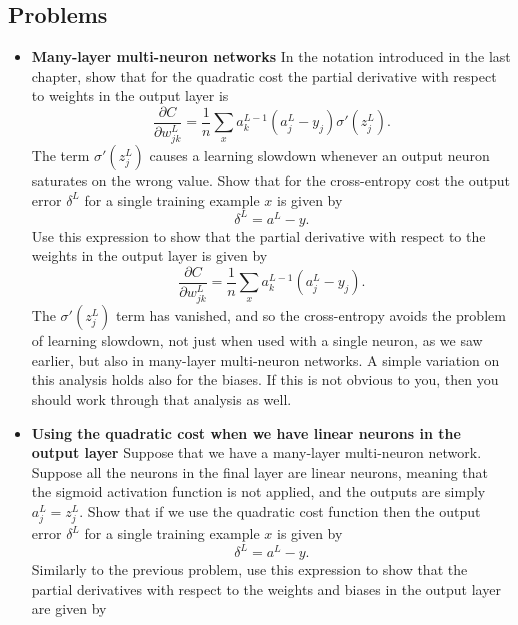 \documentclass[a4paper,twoside,10pt]{book}
\begin{document}
\subsection*{Problems}
\begin{itemize}
	\item \textbf{Many-layer multi-neuron networks} In the notation introduced in the last chapter, show that for the quadratic cost the partial derivative with respect to weights in the output layer is
	\begin{equation}
		\frac{\partial C}{\partial w^L_{jk}}  = \frac{1}{n}
		\sum_x a^{L-1}_k  (a^L_j-y_j) \sigma'(z^L_j).
		\label{eq:65}
	\end{equation}%
	The term $\sigma'(z^L_j)$ causes a learning slowdown whenever an output neuron saturates on the wrong value. Show that for the cross-entropy cost the output error 
	$\delta^L$ for a single training example $x$ is given by
	\begin{equation}
		\delta^L = a^L - y.\label{eq:66}
	\end{equation}%
	Use this expression to show that the partial derivative with respect to the weights in the output layer is given by
	\begin{equation}
		\frac{\partial C}{\partial w^L_{jk}}  =  \frac{1}{n} \sum_x 	a^{L-1}_k  (a^L_j-y_j).
		\label{eq:67}
	\end{equation}%
	The $\sigma'(z^L_j)$ term has vanished, and so the cross-entropy avoids the problem of learning slowdown, not just when used with a single neuron, as we saw earlier, but also in many-layer multi-neuron networks. A simple variation on this analysis holds also for the biases. If this is not obvious to you, then you should work through that analysis as well.
	\item \textbf{Using the quadratic cost when we have linear neurons in the output layer} Suppose that we have a many-layer multi-neuron network. Suppose all the neurons in the final layer are linear neurons, meaning that the sigmoid activation function is not applied, and the outputs are simply $a^L_j=z^L_j$. Show that if we use the quadratic cost function then the output error $\delta^L$ for a single training example $x$ is given by
	\begin{equation}
		\delta^L = a^L-y.
		\label{eq:68}
	\end{equation}%
	Similarly to the previous problem, use this expression to show that the partial derivatives with respect to the weights and biases in the output layer are given by

\end{itemize}
\end{document}
